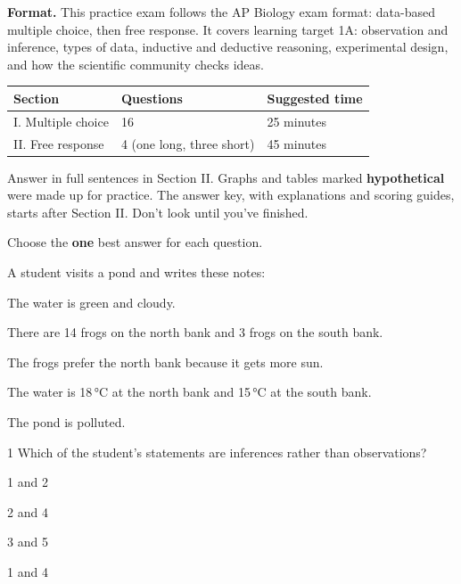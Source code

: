 \documentclass[11pt,letterpaper]{article}
\begin{document}
\textbf{Format.} This practice exam follows the AP Biology exam format: data-based multiple choice, then free response. It covers learning target 1A: observation and inference, types of data, inductive and deductive reasoning, experimental design, and how the scientific community checks ideas.

\begin{center}
\begin{tabular}{@{}lll@{}}
\toprule
Section & Questions & Suggested time \\
\midrule
I. Multiple choice & 16 & 25 minutes \\
II. Free response & 4 (one long, three short) & 45 minutes \\
\bottomrule
\end{tabular}
\end{center}

Answer in full sentences in Section II. Graphs and tables marked \textbf{hypothetical} were made up for practice. The answer key, with explanations and scoring guides, starts after Section II. Don't look until you've finished.

\clearpage


Choose the \textbf{one} best answer for each question.


A student visits a pond and writes these notes:

\begin{fieldnotes}
  \item The water is green and cloudy.
  \item There are 14 frogs on the north bank and 3 frogs on the south bank.
  \item The frogs prefer the north bank because it gets more sun.
  \item The water is 18\,°C at the north bank and 15\,°C at the south bank.
  \item The pond is polluted.
\end{fieldnotes}

\begin{mcq}{1}
Which of the student's statements are inferences rather than observations?
\begin{choices}
  \item 1 and 2
  \item 2 and 4
  \item 3 and 5
  \item 1 and 4
\end{choices}
\end{mcq}
\end{document}
